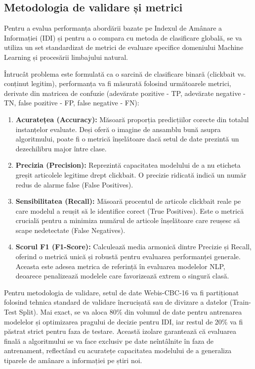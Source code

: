 \documentclass[12pt, a4paper]{article}
\begin{document}
\subsection{Metodologia de validare și metrici}

Pentru a evalua performanța abordării bazate pe Indexul de Amânare a Informației (IDI) și pentru a o compara cu metoda de clasificare globală, se va utiliza un set standardizat de metrici de evaluare specifice domeniului Machine Learning și procesării limbajului natural.

Întrucât problema este formulată ca o sarcină de clasificare binară (clickbait vs. conținut legitim), performanța va fi măsurată folosind următoarele metrici, derivate din matricea de confuzie (adevărate pozitive - TP, adevărate negative - TN, false pozitive - FP, false negative - FN):

\begin{enumerate}
    \item \textbf{Acuratețea (Accuracy):} Măsoară proporția predicțiilor corecte din totalul instanțelor evaluate. Deși oferă o imagine de ansamblu bună asupra algoritmului, poate fi o metrică înșelătoare dacă setul de date prezintă un dezechilibru major între clase.
    \item \textbf{Precizia (Precision):} Reprezintă capacitatea modelului de a nu eticheta greșit articolele legitime drept clickbait. O precizie ridicată indică un număr redus de alarme false (False Positives).
    \item \textbf{Sensibilitatea (Recall):} Măsoară procentul de articole clickbait reale pe care modelul a reușit să le identifice corect (True Positives). Este o metrică crucială pentru a minimiza numărul de articole înșelătoare care reușesc să scape nedetectate (False Negatives).
    \item \textbf{Scorul F1 (F1-Score):} Calculează media armonică dintre Precizie și Recall, oferind o metrică unică și robustă pentru evaluarea performanței generale. Aceasta este adesea metrica de referință în evaluarea modelelor NLP, deoarece penalizează modelele care favorizează extrem o singură clasă.
\end{enumerate}

Pentru metodologia de validare, setul de date Webis-CBC-16 va fi partiționat folosind tehnica standard de validare încrucișată sau de divizare a datelor (Train-Test Split). Mai exact, se va aloca 80\% din volumul de date pentru antrenarea modelelor și optimizarea pragului de decizie pentru IDI, iar restul de 20\% va fi păstrat strict pentru faza de testare. Această izolare garantează că evaluarea finală a algoritmului se va face exclusiv pe date neîntâlnite în faza de antrenament, reflectând cu acuratețe capacitatea modelului de a generaliza tiparele de amânare a informației pe știri noi.
\end{document}
